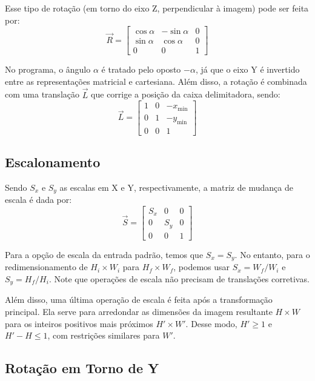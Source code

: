     Esse tipo de rotação (em torno do eixo Z, perpendicular à imagem) pode ser feita por:
    \[
        \vec{R} = \begin{bmatrix}
            \cos\alpha & -\sin\alpha & 0 \\
            \sin\alpha & \cos\alpha & 0 \\
            0 & 0 & 1
        \end{bmatrix}
    \]

    No programa, o ângulo $\alpha$ é tratado pelo oposto $-\alpha$, já que o eixo Y é invertido entre as representações matricial e cartesiana. Além disso, a rotação é combinada com uma translação $\vec{L}$ que corrige a posição da caixa delimitadora, sendo:
    \[
        \vec{L} = \begin{bmatrix}
            1 & 0 & -x_{\min} \\
            0 & 1 & -y_{\min} \\
            0 & 0 & 1
        \end{bmatrix}
    \]

\subsection{Escalonamento}

    Sendo $S_x$ e $S_y$ as escalas em X e Y, respectivamente, a matriz de mudança de escala é dada por:
    \[
        \vec{S} = \begin{bmatrix}
            S_x & 0 & 0 \\
            0 & S_y & 0 \\
            0 & 0 & 1
        \end{bmatrix}
    \]

    Para a opção de escala da entrada padrão, temos que $S_x = S_y$. No entanto, para o redimensionamento de $H_i \times W_i$ para $H_f \times W_f$, podemos usar $S_x = W_f / W_i$ e $S_y = H_f / H_i$. Note que operações de escala não precisam de translações corretivas.

    Além disso, uma última operação de escala é feita após a transformação principal. Ela serve para arredondar as dimensões da imagem resultante $H \times W$ para os inteiros positivos mais próximos $H' \times W'$. Desse modo, $H' \geq 1$ e $H' - H \leq 1$, com restrições similares para $W'$.

\subsection{Rotação em Torno de Y} \label{sec:rotacaoXY}


